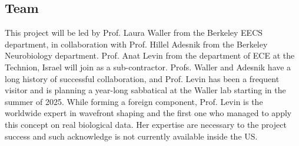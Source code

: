  
% 
%  
%
%




\subsection{Team}
This project will be led by Prof. Laura Waller from the Berkeley EECS department, in collaboration with Prof. Hillel Adesnik from the Berkeley Neurobiology department. Prof. Anat Levin from the department of ECE at the Technion, Israel will join as a sub-contractor. Profs. Waller and Adesnik have a long history of successful collaboration, and Prof. Levin has been a frequent visitor and is planning a year-long sabbatical at the Waller lab starting in the summer of 2025.
While forming a foreign component, Prof. Levin is the worldwide expert in wavefront shaping and the first one who managed to apply this concept on real biological data. Her expertise are necessary to the project success and such acknowledge is not currently available inside the US.    
